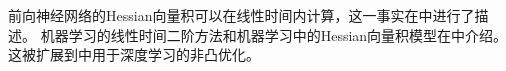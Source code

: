 前向神经网络的Hessian向量积可以在线性时间内计算，这一事实在\cite{HessianPearlmutter}中进行了描述。
机器学习的线性时间二阶方法和机器学习中的Hessian向量积模型在\cite{agarwal2017second}中介绍。这被扩展到\cite{agarwal2017finding}中用于深度学习的非凸优化。


